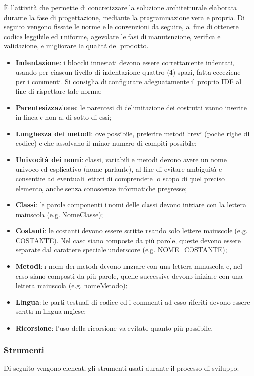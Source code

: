              È l'attività che permette di concretizzare la soluzione architetturale elaborata durante la fase di progettazione, mediante la programmazione vera e propria.
             Di seguito vengono fissate le norme e le convenzioni da seguire, al fine di ottenere codice leggibile ed uniforme, agevolare le fasi di manutenzione, verifica e validazione, e migliorare la qualità del prodotto.
             \begin{itemize}
             	\item{\textbf{Indentazione}: i blocchi innestati devono essere correttamente indentati, usando per ciascun livello di indentazione quattro (4) spazi, fatta eccezione per i commenti. Si consiglia di configurare adeguatamente il proprio IDE al fine di rispettare tale norma;}
		\item{\textbf{Parentesizzazione}: le parentesi di delimitazione dei costrutti vanno inserite in linea e non al di sotto di essi;}
		\item{\textbf{Lunghezza dei metodi}: ove possibile, preferire metodi brevi (poche righe di codice) e che assolvano il minor numero di compiti possibile;}
		\item{\textbf{Univocità dei nomi}: classi, variabili e metodi devono avere un nome univoco ed esplicativo (nome parlante), al fine di evitare ambiguità e consentire ad eventuali lettori di comprendere lo scopo di quel preciso elemento, anche senza conoscenze informatiche pregresse;}
		\item{\textbf{Classi}: le parole componenti i nomi delle classi devono iniziare con la lettera maiuscola (e.g. NomeClasse);}
		\item{\textbf{Costanti}: le costanti devono essere scritte usando solo lettere maiuscole (e.g. COSTANTE). Nel caso siano composte da più parole, queste devono essere separate dal carattere speciale underscore (e.g. NOME\_COSTANTE);}
		\item{\textbf{Metodi}: i nomi dei metodi devono iniziare con una lettera minuscola e, nel caso siano composti da più parole, quelle successive devono iniziare con una lettera maiuscola (e.g. nomeMetodo);}
		\item{\textbf{Lingua}: le parti testuali di codice ed i commenti ad esso riferiti devono essere scritti in lingua inglese;}
                	\item{\textbf{Ricorsione}: l'uso della ricorsione va evitato quanto più possibile.}
		\end{itemize}
                
        \subsubsection{Strumenti}
        Di seguito vengono elencati gli strumenti usati durante il processo di sviluppo: